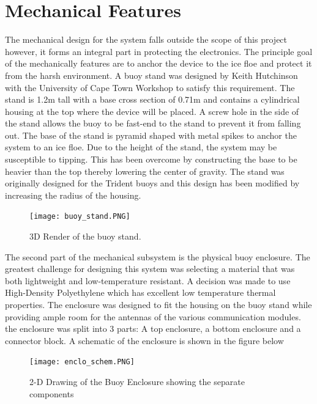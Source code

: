 \section{Mechanical Features}

The mechanical design for the system falls outside the scope of this project however, it forms an integral part in protecting the electronics. The principle goal of the mechanically features are to anchor the device to the ice floe and protect it from the harsh environment. A buoy stand was designed by Keith Hutchinson with the University of Cape Town Workshop to satisfy this requirement. The stand is 1.2m tall with a base cross section of 0.71m and contains a cylindrical housing at the top where the device will be placed. A screw hole in the side of the stand allows the buoy to be fast-end to the stand to prevent it from falling out. The base of the stand is pyramid shaped with metal spikes to anchor the system to an ice floe. Due to the height of the stand, the system may be susceptible to tipping. This has been overcome by constructing the base to be heavier than the top thereby lowering the center of gravity. The stand was originally designed for the Trident buoys and this design has been modified by increasing the radius of the housing. 

\begin{figure}[H]
    \centering
    \texttt{[image: buoy\_stand.PNG]}
    \caption{3D Render of the buoy stand.}
    \label{fig:stand}
\end{figure}

The second part of the mechanical subsystem is the physical buoy enclosure. The greatest challenge for designing this system was selecting a material that was both lightweight and low-temperature resistant. A decision was made to use High-Density Polyethylene which has excellent low temperature thermal properties. The enclosure was designed to fit the housing on the buoy stand while providing ample room for the antennas of the various communication modules. the enclosure was split into 3 parts: A top enclosure, a bottom enclosure and a connector block. A schematic of the enclosure is shown in the figure below

\begin{figure}[H]
    \centering
    \texttt{[image: enclo\_schem.PNG]}
    \caption{2-D Drawing of the Buoy Enclosure showing the separate components}
    \label{fig:enclo_schem}
\end{figure}

